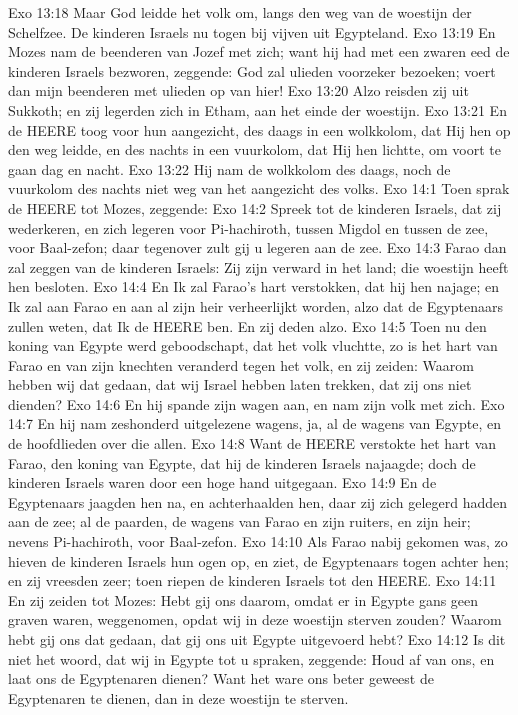Exo 13:18  Maar God leidde het volk om, langs den weg van de woestijn der Schelfzee. De kinderen Israels nu togen bij vijven uit Egypteland.
Exo 13:19  En Mozes nam de beenderen van Jozef met zich; want hij had met een zwaren eed de kinderen Israels bezworen, zeggende: God zal ulieden voorzeker bezoeken; voert dan mijn beenderen met ulieden op van hier!
Exo 13:20  Alzo reisden zij uit Sukkoth; en zij legerden zich in Etham, aan het einde der woestijn.
Exo 13:21  En de HEERE toog voor hun aangezicht, des daags in een wolkkolom, dat Hij hen op den weg leidde, en des nachts in een vuurkolom, dat Hij hen lichtte, om voort te gaan dag en nacht.
Exo 13:22  Hij nam de wolkkolom des daags, noch de vuurkolom des nachts niet weg van het aangezicht des volks.
Exo 14:1  Toen sprak de HEERE tot Mozes, zeggende:
Exo 14:2  Spreek tot de kinderen Israels, dat zij wederkeren, en zich legeren voor Pi-hachiroth, tussen Migdol en tussen de zee, voor Baal-zefon; daar tegenover zult gij u legeren aan de zee.
Exo 14:3  Farao dan zal zeggen van de kinderen Israels: Zij zijn verward in het land; die woestijn heeft hen besloten.
Exo 14:4  En Ik zal Farao's hart verstokken, dat hij hen najage; en Ik zal aan Farao en aan al zijn heir verheerlijkt worden, alzo dat de Egyptenaars zullen weten, dat Ik de HEERE ben. En zij deden alzo.
Exo 14:5  Toen nu den koning van Egypte werd geboodschapt, dat het volk vluchtte, zo is het hart van Farao en van zijn knechten veranderd tegen het volk, en zij zeiden: Waarom hebben wij dat gedaan, dat wij Israel hebben laten trekken, dat zij ons niet dienden?
Exo 14:6  En hij spande zijn wagen aan, en nam zijn volk met zich.
Exo 14:7  En hij nam zeshonderd uitgelezene wagens, ja, al de wagens van Egypte, en de hoofdlieden over die allen.
Exo 14:8  Want de HEERE verstokte het hart van Farao, den koning van Egypte, dat hij de kinderen Israels najaagde; doch de kinderen Israels waren door een hoge hand uitgegaan.
Exo 14:9  En de Egyptenaars jaagden hen na, en achterhaalden hen, daar zij zich gelegerd hadden aan de zee; al de paarden, de wagens van Farao en zijn ruiters, en zijn heir; nevens Pi-hachiroth, voor Baal-zefon.
Exo 14:10  Als Farao nabij gekomen was, zo hieven de kinderen Israels hun ogen op, en ziet, de Egyptenaars togen achter hen; en zij vreesden zeer; toen riepen de kinderen Israels tot den HEERE.
Exo 14:11  En zij zeiden tot Mozes: Hebt gij ons daarom, omdat er in Egypte gans geen graven waren, weggenomen, opdat wij in deze woestijn sterven zouden? Waarom hebt gij ons dat gedaan, dat gij ons uit Egypte uitgevoerd hebt?
Exo 14:12  Is dit niet het woord, dat wij in Egypte tot u spraken, zeggende: Houd af van ons, en laat ons de Egyptenaren dienen? Want het ware ons beter geweest de Egyptenaren te dienen, dan in deze woestijn te sterven.
